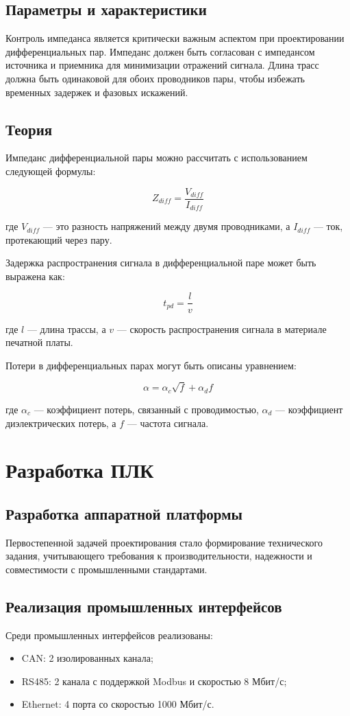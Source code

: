 \documentclass[16pt]{article}
\begin{document}
\subsection{Параметры и характеристики}
Контроль импеданса является критически важным аспектом при проектировании дифференциальных пар. Импеданс должен быть согласован с импедансом источника и приемника для минимизации отражений сигнала. Длина трасс должна быть одинаковой для обоих проводников пары, чтобы избежать временных задержек и фазовых искажений.

\subsection{Теория}
Импеданс дифференциальной пары можно рассчитать с использованием следующей формулы:

\[ Z_{diff} = \frac{V_{diff}}{I_{diff}} \]

где \( V_{diff} \) — это разность напряжений между двумя проводниками, а \( I_{diff} \) — ток, протекающий через пару.

Задержка распространения сигнала в дифференциальной паре может быть выражена как:

\[ t_{pd} = \frac{l}{v} \]

где \( l \) — длина трассы, а \( v \) — скорость распространения сигнала в материале печатной платы.

Потери в дифференциальных парах могут быть описаны уравнением:

\[ \alpha = \alpha_c \sqrt{f} + \alpha_d f \]

где \( \alpha_c \) — коэффициент потерь, связанный с проводимостью, \( \alpha_d \) — коэффициент диэлектрических потерь, а \( f \) — частота сигнала.


\section{Разработка ПЛК}
\subsection{Разработка аппаратной платформы}
Первостепенной задачей проектирования стало формирование технического задания, учитывающего требования к производительности, надежности и совместимости с промышленными стандартами.

\subsection{Реализация промышленных интерфейсов}
Среди промышленных интерфейсов реализованы:
\begin{itemize}
    \item CAN: 2 изолированных канала;
    \item RS485: 2 канала с поддержкой Modbus и скоростью 8 Мбит/с;
    \item Ethernet: 4 порта со скоростью 1000 Мбит/с.
\end{itemize}
\end{document}
